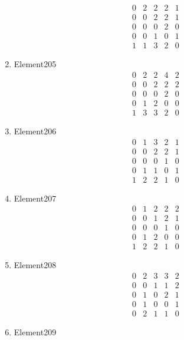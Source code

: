 \documentclass[12pt]{article}
\begin{document}
\begin{multicols}{3}
\begin{enumerate}
\begin{equation*}
\begin{array}{ccccc}
0&2&2&2&1\\
0&0&2&2&1\\
0&0&0&2&0\\
0&0&1&0&1\\
1&1&3&2&0
\end{array}
\end{equation*}
\item Element205
\begin{equation*}
\begin{array}{ccccc}
0&2&2&4&2\\
0&0&2&2&2\\
0&0&0&2&0\\
0&1&2&0&0\\
1&3&3&2&0
\end{array}
\end{equation*}
\item Element206
\begin{equation*}
\begin{array}{ccccc}
0&1&3&2&1\\
0&0&2&2&1\\
0&0&0&1&0\\
0&1&1&0&1\\
1&2&2&1&0
\end{array}
\end{equation*}
\item Element207
\begin{equation*}
\begin{array}{ccccc}
0&1&2&2&2\\
0&0&1&2&1\\
0&0&0&1&0\\
0&1&2&0&0\\
1&2&2&1&0
\end{array}
\end{equation*}
\item Element208
\begin{equation*}
\begin{array}{ccccc}
0&2&3&3&2\\
0&0&1&1&2\\
0&1&0&2&1\\
0&1&0&0&1\\
0&2&1&1&0
\end{array}
\end{equation*}
\item Element209
\begin{equation*}
\begin{array}{ccccc}

\end{array}
\end{equation*}
\end{enumerate}
\end{multicols}
\end{document}
